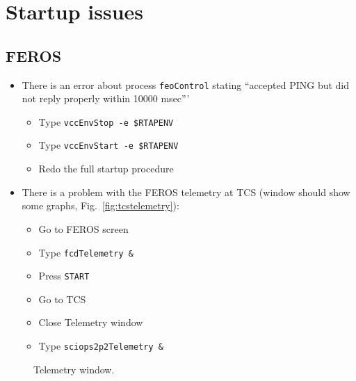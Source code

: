 \documentclass[11pt,fleqn]{book} %
\newcounter{procedure}[chapter]
\begin{document}
\newpage
\section{Startup issues}

\subsection{FEROS}
\label{sec:ferosstartuptimeout}
\begin{itemize}
  \item There is an error about process \texttt{feoControl} stating
      ``accepted PING but did not reply properly within 10000 msec'''
      \begin{itemize}
        \item Type \texttt{vccEnvStop -e \$RTAPENV}
        \item Type \texttt{vccEnvStart -e \$RTAPENV}
        \item Redo the full startup procedure
      \end{itemize}
 \item There is a problem with the FEROS telemetry at TCS (window should show some graphs, Fig.~\ref{fig:tcstelemetry}):
      \begin{itemize}
        \item Go to FEROS screen
        \item Type \texttt{fcdTelemetry \&}
        \item Press \texttt{START}
        \item Go to TCS
        \item Close Telemetry window
        \item Type \texttt{sciops2p2Telemetry \&}
      \end{itemize}
\end{itemize}

\begin{figure}[t!]
\begin{minipage}{0.48\linewidth}
\end{minipage}
\hspace{0.02\linewidth}
\begin{minipage}{0.48\linewidth}
\end{minipage}
\caption{Telemetry window.}
\end{figure}
\end{document}
